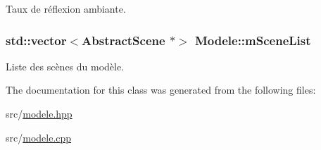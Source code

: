 Taux de réflexion ambiante. 

\subsubsection[{\texorpdfstring{m\+Scene\+List}{mSceneList}}]{\setlength{\rightskip}{0pt plus 5cm}std\+::vector$<${\bf Abstract\+Scene} $\ast$$>$ Modele\+::m\+Scene\+List}\hypertarget{class_modele_a5b1fde589f17e1f6a87c00022ae2821e}{}\label{class_modele_a5b1fde589f17e1f6a87c00022ae2821e}


Liste des scènes du modèle. 



The documentation for this class was generated from the following files\+:\begin{DoxyCompactItemize}
\item 
src/\hyperlink{modele_8hpp}{modele.\+hpp}\item 
src/\hyperlink{modele_8cpp}{modele.\+cpp}\end{DoxyCompactItemize}
